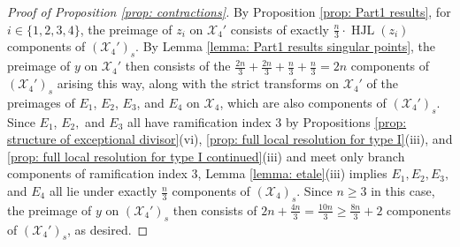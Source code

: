 \documentclass[12pt]{amsart}
\numberwithin{equation}{section}
\theoremstyle{definition}
\newcommand{\X}{\mathcal{X}}
\newcommand{\Y}{\mathcal{Y}}
\newcommand{\tx}[1]{\text{#1}}
\DeclareMathOperator{\HJL}{HJL}
\begin{document}
\begin{proof}[Proof of Proposition \ref{prop: contractions}]
    By Proposition \ref{prop: Part1 results}, for $i\in\{1,2,3,4\}$, the preimage of $z_i$ on $\X_4'$ consists of exactly $\frac{n}{3}\cdot\HJL(z_i)$ components of $(\X_4')_s$. By Lemma \ref{lemma: Part1 results singular points}, the preimage of $y$ on $\X_4'$ then consists of the $\frac{2n}{3}+\frac{2n}{3}+\frac{n}{3}+\frac{n}{3}=2n$ components of $(\X_4')_s$ arising this way, along with the strict transforms on $\X_4'$ of the preimages of $E_1$, $E_2$, $E_3$, and $E_4$ on $\X_4$, which are also components of $(\X_4')_s$. Since $E_1$, $E_2,$ and $E_3$ all have ramification index $3$ by Propositions \ref{prop: structure of exceptional divisor}(vi), \ref{prop: full local resolution for type I}(iii), and \ref{prop: full local resolution for type I continued}(iii) and meet only branch components of ramification index $3$,
    Lemma \ref{lemma: etale}(iii) implies $E_1,E_2,E_3,$ and $E_4$ all lie under exactly $\frac{n}{3}$ components of $(\X_4)_s$. Since $n\geq 3$ in this case, the preimage of $y$ on $(\X_4')_s$ then consists of $2n+\frac{4n}{3}=\frac{10n}{3}\geq \frac{8n}{3}+2$ components of $(\X_4')_s$, as desired. 

\end{proof}
\end{document}

